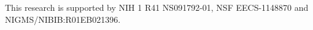 \documentclass{article}
\begin{document}
This research is supported by NIH 1 R41 NS091792-01, NSF EECS-1148870 and NIGMS/NIBIB:R01EB021396.%

\let\oldbibliography\thebibliography
\renewcommand{\thebibliography}[1]{%
  \oldbibliography{#1}%
  \setlength{\itemsep}{0pt}%
}

\small


\end{document}
